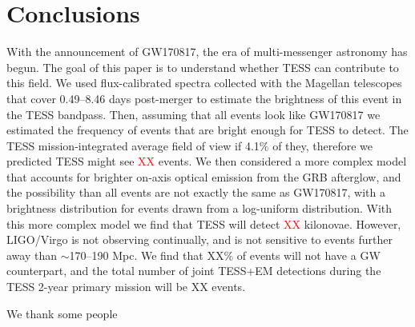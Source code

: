 \documentclass[modern]{aastex61}
\newcommand{\red}[1]{\textcolor{red}{#1}}
\begin{document}
\section{Conclusions}
With the announcement of GW170817, the era of multi-messenger astronomy has begun. The goal of this paper is to understand whether TESS can contribute to this field. We used flux-calibrated spectra collected with the Magellan telescopes that cover 0.49--8.46 days post-merger to estimate the brightness of this event in the TESS bandpass. Then, assuming that all events look like GW170817 we estimated the frequency of events that are bright enough for TESS to detect. The TESS mission-integrated average field of view if 4.1\% of they, therefore we predicted TESS might see \red{XX} events. We then considered a more complex model that accounts for brighter on-axis optical emission from the GRB afterglow, and the possibility than all events are not exactly the same as GW170817, with a brightness distribution for events drawn from a log-uniform distribution. With this more complex model we find that TESS will detect \red{XX} kilonovae. However, LIGO/Virgo is not observing continually, and is not sensitive to events further away than $\sim$170--190 Mpc. We find that XX\% of events will not have a GW counterpart, and the total number of joint TESS+EM detections during the TESS 2-year primary mission will be XX events. 



\acknowledgments

We thank some people





{}

\end{document}
